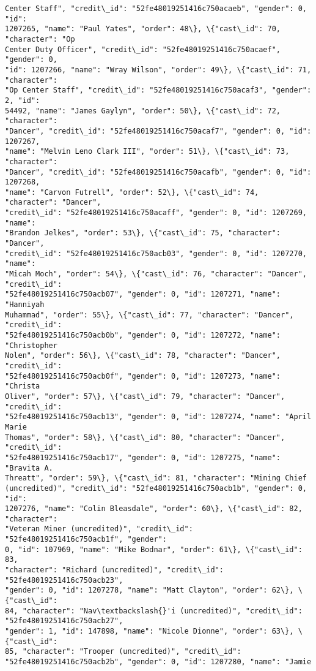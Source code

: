 \documentclass[11pt]{article}
\begin{document}
\begin{tcolorbox}[breakable, size=fbox, boxrule=.5pt, pad at break*=1mm, opacityfill=0]
\begin{Verbatim}[commandchars=\\\{\}]
Center Staff", "credit\_id": "52fe48019251416c750acaeb", "gender": 0, "id":
1207265, "name": "Paul Yates", "order": 48\}, \{"cast\_id": 70, "character": "Op
Center Duty Officer", "credit\_id": "52fe48019251416c750acaef", "gender": 0,
"id": 1207266, "name": "Wray Wilson", "order": 49\}, \{"cast\_id": 71, "character":
"Op Center Staff", "credit\_id": "52fe48019251416c750acaf3", "gender": 2, "id":
54492, "name": "James Gaylyn", "order": 50\}, \{"cast\_id": 72, "character":
"Dancer", "credit\_id": "52fe48019251416c750acaf7", "gender": 0, "id": 1207267,
"name": "Melvin Leno Clark III", "order": 51\}, \{"cast\_id": 73, "character":
"Dancer", "credit\_id": "52fe48019251416c750acafb", "gender": 0, "id": 1207268,
"name": "Carvon Futrell", "order": 52\}, \{"cast\_id": 74, "character": "Dancer",
"credit\_id": "52fe48019251416c750acaff", "gender": 0, "id": 1207269, "name":
"Brandon Jelkes", "order": 53\}, \{"cast\_id": 75, "character": "Dancer",
"credit\_id": "52fe48019251416c750acb03", "gender": 0, "id": 1207270, "name":
"Micah Moch", "order": 54\}, \{"cast\_id": 76, "character": "Dancer", "credit\_id":
"52fe48019251416c750acb07", "gender": 0, "id": 1207271, "name": "Hanniyah
Muhammad", "order": 55\}, \{"cast\_id": 77, "character": "Dancer", "credit\_id":
"52fe48019251416c750acb0b", "gender": 0, "id": 1207272, "name": "Christopher
Nolen", "order": 56\}, \{"cast\_id": 78, "character": "Dancer", "credit\_id":
"52fe48019251416c750acb0f", "gender": 0, "id": 1207273, "name": "Christa
Oliver", "order": 57\}, \{"cast\_id": 79, "character": "Dancer", "credit\_id":
"52fe48019251416c750acb13", "gender": 0, "id": 1207274, "name": "April Marie
Thomas", "order": 58\}, \{"cast\_id": 80, "character": "Dancer", "credit\_id":
"52fe48019251416c750acb17", "gender": 0, "id": 1207275, "name": "Bravita A.
Threatt", "order": 59\}, \{"cast\_id": 81, "character": "Mining Chief
(uncredited)", "credit\_id": "52fe48019251416c750acb1b", "gender": 0, "id":
1207276, "name": "Colin Bleasdale", "order": 60\}, \{"cast\_id": 82, "character":
"Veteran Miner (uncredited)", "credit\_id": "52fe48019251416c750acb1f", "gender":
0, "id": 107969, "name": "Mike Bodnar", "order": 61\}, \{"cast\_id": 83,
"character": "Richard (uncredited)", "credit\_id": "52fe48019251416c750acb23",
"gender": 0, "id": 1207278, "name": "Matt Clayton", "order": 62\}, \{"cast\_id":
84, "character": "Nav\textbackslash{}'i (uncredited)", "credit\_id": "52fe48019251416c750acb27",
"gender": 1, "id": 147898, "name": "Nicole Dionne", "order": 63\}, \{"cast\_id":
85, "character": "Trooper (uncredited)", "credit\_id":
"52fe48019251416c750acb2b", "gender": 0, "id": 1207280, "name": "Jamie

\end{Verbatim}
\end{tcolorbox}
\end{document}
